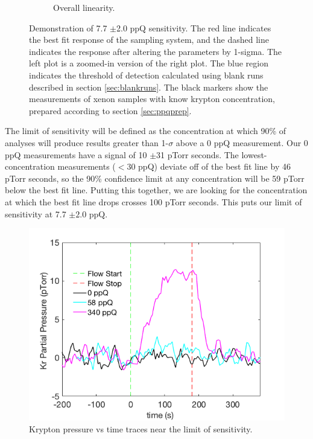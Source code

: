 \begin{figure}[h!]
\begin{subfigure}{0.5\textwidth}
  \caption{Overall linearity.}
\end{subfigure}
\caption{Demonstration of 7.7 $\pm$2.0 ppQ sensitivity. The red line indicates the best fit response of the sampling system, and the dashed line indicates the response after altering the parameters by 1-sigma. The left plot is a zoomed-in version of the right plot. The blue region indicates the threshold of detection calculated using blank runs described in section \ref{sec:blankruns}. The black markers show the measurements of xenon samples with know krypton concentration, prepared according to section \ref{sec:ppqprep}.}
\label{fig:linplot2017}
\end{figure}

The limit of sensitivity will be defined as the concentration at which 90\% of analyses will produce results greater than 1-$\sigma$ above a 0 ppQ measurement. Our 0 ppQ measurements have a signal of 10 $\pm$31 pTorr seconds. The lowest-concentration measurements ($<30$ ppQ) deviate off of the best fit line by 46 pTorr seconds, so the 90\% confidence limit at any concentration will be 59 pTorr below the best fit line. Putting this together, we are looking for the concentration at which the best fit line drops crosses 100 pTorr seconds. This puts our limit of sensitivity at 7.7 $\pm 2.0$ ppQ.


\begin{figure}[h!]
  \includegraphics[width=\linewidth]{Figures/SLAC_PvT_ppq_sensitivity.png}
  \caption{Krypton pressure vs time traces near the limit of sensitivity.}
  \label{fig:senstrace}
\end{figure}

